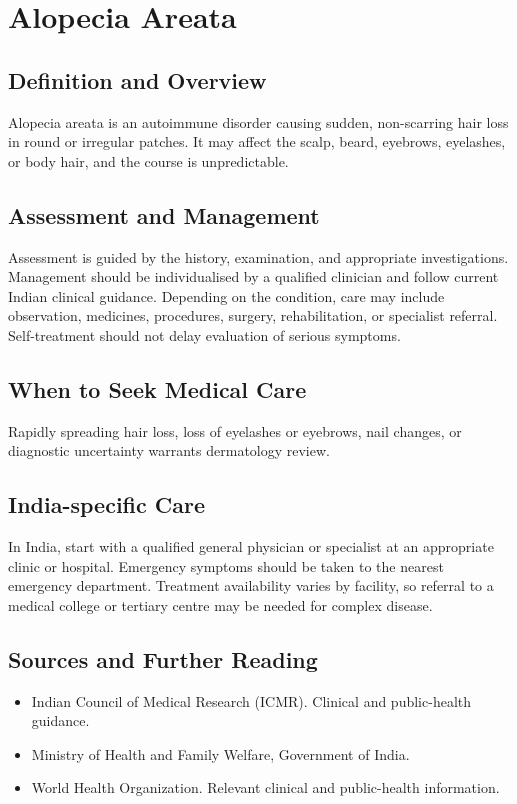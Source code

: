 \chapter{Alopecia Areata}

\section*{Definition and Overview}
Alopecia areata is an autoimmune disorder causing sudden, non-scarring hair loss in round or irregular patches. It may affect the scalp, beard, eyebrows, eyelashes, or body hair, and the course is unpredictable.

\section*{Assessment and Management}
Assessment is guided by the history, examination, and appropriate investigations. Management should be individualised by a qualified clinician and follow current Indian clinical guidance. Depending on the condition, care may include observation, medicines, procedures, surgery, rehabilitation, or specialist referral. Self-treatment should not delay evaluation of serious symptoms.

\section*{When to Seek Medical Care}
Rapidly spreading hair loss, loss of eyelashes or eyebrows, nail changes, or diagnostic uncertainty warrants dermatology review.

\section*{India-specific Care}
In India, start with a qualified general physician or specialist at an appropriate clinic or hospital. Emergency symptoms should be taken to the nearest emergency department. Treatment availability varies by facility, so referral to a medical college or tertiary centre may be needed for complex disease.

\section*{Sources and Further Reading}
\begin{itemize}
    \item Indian Council of Medical Research (ICMR). Clinical and public-health guidance.
    \item Ministry of Health and Family Welfare, Government of India.
    \item World Health Organization. Relevant clinical and public-health information.
\end{itemize}

